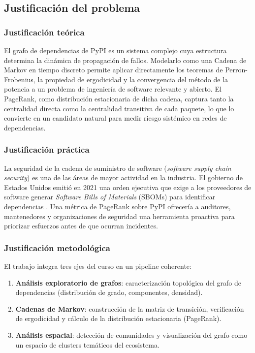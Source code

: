 \subsection{Justificación del problema}

\subsubsection{Justificación teórica}
El grafo de dependencias de PyPI es un sistema complejo cuya estructura determina
la dinámica de propagación de fallos. Modelarlo como una Cadena de Markov en tiempo
discreto permite aplicar directamente los teoremas de Perron-Frobenius, la propiedad
de ergodicidad y la convergencia del método de la potencia a un problema de
ingeniería de software relevante y abierto. El PageRank, como distribución
estacionaria de dicha cadena, captura tanto la centralidad directa como la
centralidad transitiva de cada paquete, lo que lo convierte en un candidato
natural para medir riesgo sistémico en redes de dependencias.

\subsubsection{Justificación práctica}
La seguridad de la cadena de suministro de software (\textit{software supply chain
security}) es una de las áreas de mayor actividad en la industria. El gobierno de
Estados Unidos emitió en 2021 una orden ejecutiva que exige a los proveedores de
software generar \textit{Software Bills of Materials} (SBOMs) para identificar
dependencias \autocite{kikas2017structure}. Una métrica de PageRank sobre PyPI
ofrecería a auditores, mantenedores y organizaciones de seguridad una herramienta
proactiva para priorizar esfuerzos antes de que ocurran incidentes.

\subsubsection{Justificación metodológica}
El trabajo integra tres ejes del curso en un pipeline coherente:
\begin{enumerate}
    \item \textbf{Análisis exploratorio de grafos}: caracterización topológica del
          grafo de dependencias (distribución de grado, componentes, densidad).
    \item \textbf{Cadenas de Markov}: construcción de la matriz de transición,
          verificación de ergodicidad y cálculo de la distribución estacionaria
          (PageRank).
    \item \textbf{Análisis espacial}: detección de comunidades y visualización
          del grafo como un espacio de clusters temáticos del ecosistema.
\end{enumerate}

